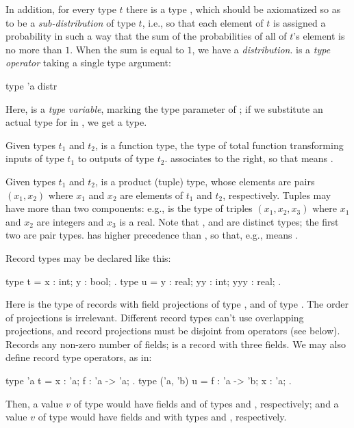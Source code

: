 In addition, for every type $t$ there is a type , which
should be axiomatized so as to be a \emph{sub-distribution} of type
$t$, i.e., so that each element of $t$ is assigned a probability in
such a way that the sum of the probabilities of all of $t$'s element
is no more than $1$. When the sum is equal to $1$, we have a
\emph{distribution}.  is a \emph{type operator} taking a
single type argument:
\begin{easycrypt}{}{}
  type 'a distr
\end{easycrypt}
Here,  is a \emph{type variable}, marking the type parameter of
; if we substitute an actual type for  in ,
we get a type.

Given types $t_1$ and $t_2$,  is a function type,
the type of total function transforming inputs of type $t_1$ to
outputs of type $t_2$. \ec{->} associates to the right, so that
 means .

Given types $t_1$ and $t_2$,  is a product (tuple)
type, whose elements are pairs $(x_1, x_2)$ where $x_1$ and $x_2$ are
elements of $t_1$ and $t_2$, respectively. Tuples may have more than
two components: e.g.,  is the type of triples
$(x_1, x_2, x_3)$ where $x_1$ and $x_2$ are integers and $x_3$ is a real.
Note that ,  and
 are distinct types; the first two are pair types.
\ec{*} has higher precedence than \ec{->}, so that, e.g.,
 means .

Record types may be declared like this:
\begin{easycrypt}{}{}
  type t = { x : int; y : bool; }.
  type u = { y : real; yy : int; yyy : real; }.
\end{easycrypt}
Here  is the type of records with field projections  of
type , and  of type . The order of projections is
irrelevant.  Different record types can't use overlapping projections,
and record projections must be disjoint from operators (see
below). Records any non-zero number of fields;  is a record with
three fields. We may also define record type operators, as in:
\begin{easycrypt}{}{}
  type 'a t = { x : 'a; f : 'a -> 'a; }.
  type ('a, 'b) u = { f : 'a -> 'b; x : 'a; }.
\end{easycrypt}
Then, a value $v$ of type  would have fields  and
 of types  and , respectively; and
a value $v$ of type  would have fields  and
 with types  and , respectively.

